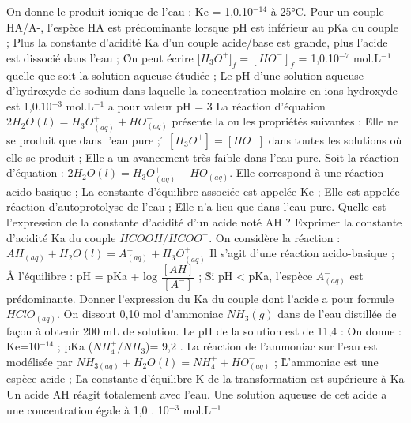 \q	
On donne le produit ionique de l’eau : Ke = 1,0.10$^{-14}$ à 25°C.
\rv
	  Pour un couple HA/A-, l’espèce HA est prédominante lorsque pH est inférieur au pKa du couple ;
\rv
	  Plus la constante d’acidité Ka d’un couple acide/base est grande, plus l’acide est dissocié dans l’eau ;
\r
	  On peut écrire [$H_3O^+]_f = [HO^{-}]_f$ = 1,0.10$^{-7}$ mol.L$^{-1}$ quelle que soit la solution aqueuse étudiée ;
\r	
	  Le pH d’une solution aqueuse d’hydroxyde de sodium dans laquelle la concentration molaire en ions hydroxyde est 1,0.10$^{-3}$ mol.L$^{-1}$ a pour valeur pH = 3 
 \q	
 La réaction d’équation $2 H_2O(l) = H_3O^+_{(aq)}  + HO^{-}_{(aq)}$ présente la ou les propriétés suivantes :
 \r
  Elle ne se produit que dans l’eau pure ; 
\r
  $[H_3O^+] = [HO^{-}]$  dans toutes les solutions où elle se produit ;
\rv
  Elle a un avancement très faible dans l’eau pure.
 \q	
 Soit la réaction d’équation :	$2 H_2O(l) = H_3O^+_{(aq)}  +  HO^{-}_{(aq)}.$
\rv
  Elle correspond à une réaction acido-basique ;
\rv
  La constante d’équilibre associée est appelée Ke ; 
\rv
  Elle est appelée réaction d’autoprotolyse de l’eau ;
 \r
   Elle n’a lieu que dans l’eau pure.
  \q
 	Quelle est l’expression de la constante d’acidité d’un acide noté AH ?
  \q	Exprimer la constante d’acidité Ka du couple $HCOOH/HCOO^{-}$.
   \q	On considère la réaction :	 $AH_{(aq)} + H_2O(l) = A^-_{(aq)} + H_3O^+_{(aq)}$
\rv
 	Il s’agit d’une réaction acido-basique ;
\r 	
A l’équilibre : pH = pKa + log $\dfrac{[AH]}{[A^-]}$  ;
\r
 	Si pH < pKa, l’espèce $A^-_{(aq)}$ est prédominante.
 \q	
 Donner l’expression du Ka du couple dont l’acide a pour formule $HClO_{(aq)}$.
  \q
  	On dissout 0,10 mol d’ammoniac $NH_3(g)$ dans de l’eau distillée de façon à obtenir 200 mL de solution.
Le pH de la solution est de 11,4 :
On donne :    Ke=10$^{-14}$ ;     pKa ($NH_4^+/NH_3$)=  9,2 .
\rv
  La réaction de l’ammoniac sur l’eau est modélisée par $NH_{3(aq)} + H_2O(l) = NH_4^+ + HO^{-}_{(aq)}$ ;
\r
  L’ammoniac est une espèce acide ;
\r
  La constante d’équilibre K de la transformation est supérieure à  Ka
 \q	
 Un acide AH réagit totalement avec l’eau. Une solution aqueuse de cet acide a une concentration égale à 1,0 . 10$^{-3}$ mol.L$^{-1}$ 
